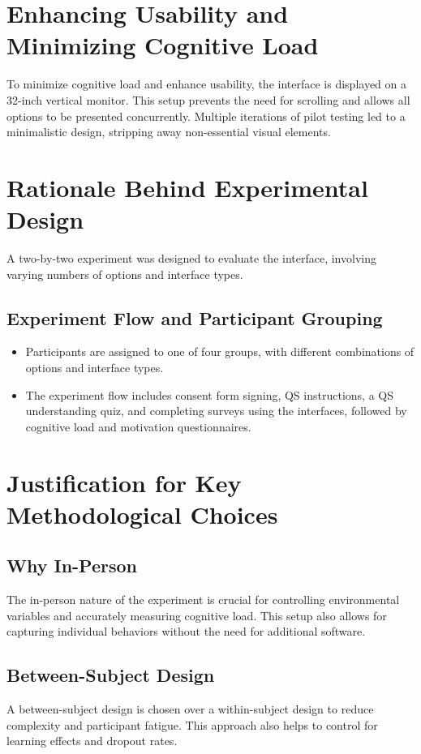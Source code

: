 \section{Enhancing Usability and Minimizing Cognitive Load}
To minimize cognitive load and enhance usability, the interface is displayed on a 32-inch vertical monitor. This setup prevents the need for scrolling and allows all options to be presented concurrently. Multiple iterations of pilot testing led to a minimalistic design, stripping away non-essential visual elements.

\section{Rationale Behind Experimental Design}
A two-by-two experiment was designed to evaluate the interface, involving varying numbers of options and interface types.

\subsection{Experiment Flow and Participant Grouping}
\begin{itemize}
    \item Participants are assigned to one of four groups, with different combinations of options and interface types.
    \item The experiment flow includes consent form signing, QS instructions, a QS understanding quiz, and completing surveys using the interfaces, followed by cognitive load and motivation questionnaires.
\end{itemize}

\section{Justification for Key Methodological Choices}
\subsection{Why In-Person}
The in-person nature of the experiment is crucial for controlling environmental variables and accurately measuring cognitive load. This setup also allows for capturing individual behaviors without the need for additional software.

\subsection{Between-Subject Design}
A between-subject design is chosen over a within-subject design to reduce complexity and participant fatigue. This approach also helps to control for learning effects and dropout rates.

